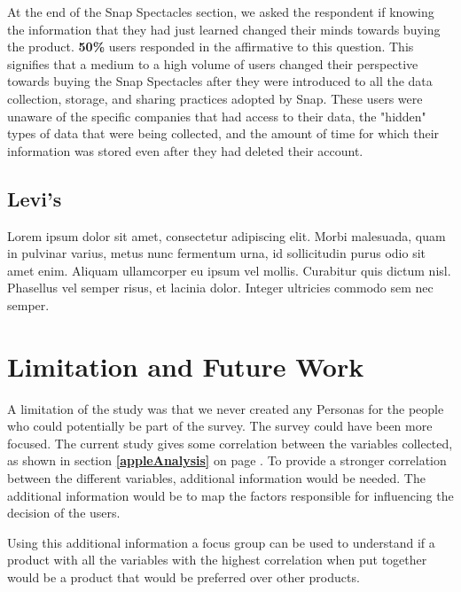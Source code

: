 \documentclass[sigconf]{acmart}
\begin{document}
At the end of the Snap Spectacles section, we asked the respondent if knowing the information that they had just learned changed their minds towards buying the product. \textbf{50\%} users responded in the affirmative to this question. This signifies that a medium to a high volume of users changed their perspective towards buying the Snap Spectacles after they were introduced to all the data collection, storage, and sharing practices adopted by Snap. These users were unaware of the specific companies that had access to their data, the "hidden" types of data that were being collected, and the amount of time for which their information was stored even after they had deleted their account.  

\subsection{Levi's} \label{levisAnalysis}

Lorem ipsum dolor sit amet, consectetur adipiscing elit. Morbi
malesuada, quam in pulvinar varius, metus nunc fermentum urna, id
sollicitudin purus odio sit amet enim. Aliquam ullamcorper eu ipsum
vel mollis. Curabitur quis dictum nisl. Phasellus vel semper risus, et
lacinia dolor. Integer ultricies commodo sem nec semper.


\section{Limitation and Future Work} \label{limitationAndFutureWork}
A limitation of the study was that we never created any Personas for the people who could potentially be part of the survey. The survey could have been more focused. The current study gives some correlation between the variables collected, as shown in section \textbf{\ref{appleAnalysis}} on page \textbf{\pageref{fig:changeDos}}. To provide a stronger correlation between the different variables, additional information would be needed. The additional information would be to map the factors responsible for influencing the decision of the users.  

Using this additional information a focus group can be used to understand if a product with all the variables with the highest correlation when put together would be a product that would be preferred over other products.




\end{document}
